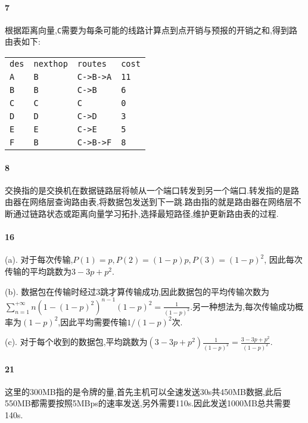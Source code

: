 \documentclass[a4paper]{article}
\begin{document}
\paragraph{7}
根据距离向量,\verb|C|需要为每条可能的线路计算点到点开销与预报的开销之和,得到路由表如下:
\begin{table}[H]
    \begin{tabular}{|llll|}
        \hline
        \verb|des| & \verb|nexthop| & \verb|routes|  & \verb|cost| \\
        \verb|A|   & \verb|B|       & \verb|C->B->A| & \verb|11|   \\
        \verb|B|   & \verb|B|       & \verb|C->B|    & \verb|6|    \\
        \verb|C|   & \verb|C|       & \verb|C|       & \verb|0|    \\
        \verb|D|   & \verb|D|       & \verb|C->D|    & \verb|3|    \\
        \verb|E|   & \verb|E|       & \verb|C->E|    & \verb|5|    \\
        \verb|F|   & \verb|B|       & \verb|C->B->F| & \verb|8|    \\ \hline
    \end{tabular}
\end{table}
\paragraph{8}
交换指的是交换机在数据链路层将帧从一个端口转发到另一个端口.转发指的是路由器在网络层查询路由表,将数据包发送到下一跳.路由指的就是路由器在网络层不断通过链路状态或距离向量学习拓扑,选择最短路径,维护更新路由表的过程.
\paragraph{16}
(a). 对于每次传输,$P(1)=p,P(2)=(1-p)p,P(3)=(1-p)^2$, 因此每次传输的平均跳数为$3-3p+p^2$.

(b). 数据包在传输时经过3跳才算传输成功,因此数据包的平均传输次数为$\sum_{n=1}^{+\infty}n(1-(1-p)^2)^{n-1}(1-p)^2=\frac{1}{(1-p)^2}$.另一种想法为,每次传输成功概率为$(1-p)^2$,因此平均需要传输$1/(1-p)^2$次.

(c). 对于每个收到的数据包,平均跳数为$(3-3p+p^2)\frac{1}{(1-p)^2}=\frac{3-3p+p^2}{(1-p)^2}$.
\paragraph{21}
这里的300MB指的是令牌的量,首先主机可以全速发送30s共450MB数据,此后550MB都需要按照5MBps的速率发送,另外需要110s.因此发送1000MB总共需要140s.
\end{document}
